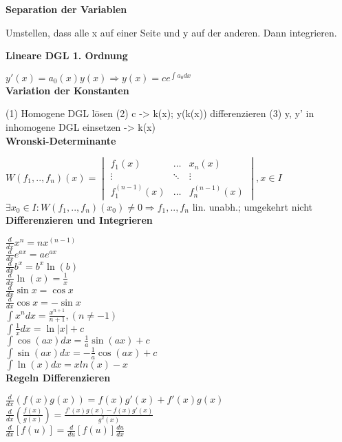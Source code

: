 \documentclass[10pt,twocolumn,a4paper]{article}
\begin{document}
\begin{flushleft}
\textbf{Separation der Variablen}

Umstellen, dass alle x auf einer Seite und y auf der anderen. Dann integrieren.

\textbf{Lineare DGL 1. Ordnung}

$y'(x)=a_0(x)y(x) \Rightarrow y(x) = ce^{\int{a_0}dx}$\\

\textbf{Variation der Konstanten}

(1) Homogene DGL lösen (2) c -> k(x); y(k(x)) differenzieren (3) y, y' in inhomogene DGL einsetzen -> k(x)\\

\textbf{Wronski-Determinante}

$ W(f_1,..,f_n)(x) =
\begin{vmatrix}
    f_{1}(x) & \dots  & x_{n}(x) \\
    \vdots & \ddots & \vdots \\
    f_{1}^{(n-1)}(x) & \dots & f_n^{(n-1)}(x)
\end{vmatrix}, x \in I
$\\
$\exists x_0 \in I: W(f_1,..,f_n)(x_0) \neq 0 \Rightarrow f_1,..,f_n$ lin. unabh.; umgekehrt nicht\\

\textbf{Differenzieren und Integrieren}

$\frac{d}{{dx}}x^n  = nx^{\left( {n - 1} \right)}$\\
$\frac{d}{{dx}}e^{ax}  = ae^{ax}$\\
$\frac{d}{{dx}}b^x  = b^x \ln \left( b \right)$\\
$\frac{d}{{dx}}\ln \left( x \right) = \frac{1}{x}$\\
$\frac{d}{{dx}}\sin x = \cos x$\\
$\frac{d}{{dx}}\cos x =  - \sin x$\\

$\int {x^n } dx = \frac{{x^{n + 1} }}{{n + 1}},(n \ne  - 1)$\\
$\int {\frac{1}{x}} dx = \ln \left| x \right| + c$\\
$\int {\cos (ax)} dx = \frac{1}{a}\sin (ax) + c$\\
$\int {\sin (ax)} dx =  - \frac{1}{a}\cos (ax) + c$\\
$\int {\ln (x)} dx = x ln(x) -x$\\

\textbf{Regeln Differenzieren}

$\frac{d}{{dx}}\left( {f\left( x \right)g\left( x \right)} \right) = f\left( x \right)g'\left( x \right) + f'\left( x \right)g\left( x \right)$\\
$\frac{d}{{dx}}\left( {\frac{{f\left( x \right)}}{{g\left( x \right)}}} \right) = \frac{{f'\left( x \right)g\left( x \right) - f\left( x \right)g'\left( x \right)}}{{g^2 \left( x \right)}}$\\
$\frac{d}{{dx}}\left[ {f\left( u \right)} \right] = \frac{d}{{du}}\left[ {f\left( u \right)} \right]\frac{{du}}{{dx}}$\\


\end{flushleft}
\end{document}
